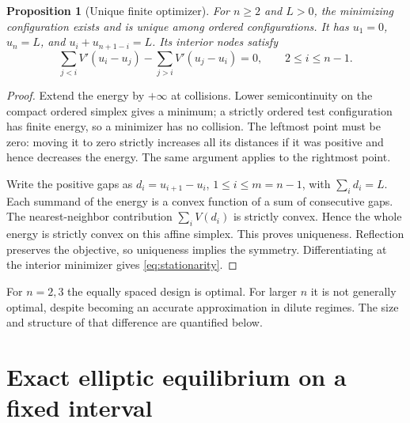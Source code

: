 \documentclass[11pt,a4paper]{article}
\newtheorem{proposition}[theorem]{Proposition}
\theoremstyle{definition}
\theoremstyle{remark}
\begin{document}
\begin{proposition}[Unique finite optimizer]
\label{prop:unique}
For $n\ge2$ and $L>0$, the minimizing configuration exists and is unique
among ordered configurations. It has $u_1=0$, $u_n=L$, and
$u_i+u_{n+1-i}=L$. Its interior nodes satisfy
\begin{equation}
 \sum_{j<i}V'(u_i-u_j)-\sum_{j>i}V'(u_j-u_i)=0,
 \qquad 2\le i\le n-1.
 \label{eq:stationarity}
\end{equation}
\end{proposition}
\begin{proof}
Extend the energy by $+\infty$ at collisions. Lower semicontinuity on the
compact ordered simplex gives a minimum; a strictly ordered test
configuration has finite energy, so a minimizer has no collision. The
leftmost point must be zero: moving it to zero strictly increases all its
distances if it was positive and hence decreases the energy. The same
argument applies to the rightmost point.

Write the positive gaps as $d_i=u_{i+1}-u_i$, $1\le i\le m=n-1$, with
$\sum_i d_i=L$. Each summand of the energy is a convex function of a sum of
consecutive gaps. The nearest-neighbor contribution $\sum_iV(d_i)$ is
strictly convex. Hence the whole energy is strictly convex on this affine
simplex. This proves uniqueness. Reflection preserves the objective, so
uniqueness implies the symmetry. Differentiating at the interior minimizer
gives \eqref{eq:stationarity}.
\end{proof}

For $n=2,3$ the equally spaced design is optimal. For larger $n$ it is not
generally optimal, despite becoming an accurate approximation in dilute
regimes. The size and structure of that difference are quantified below.

\section{Exact elliptic equilibrium on a fixed interval}
\label{sec:equilibrium}
\end{document}
